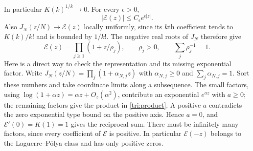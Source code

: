 In particular $K(k)^{1/k}\to0$.  For every $\epsilon>0$,
\[
 |\mathcal E(z)|\le C_\epsilon e^{\epsilon|z|}.
\]
Also $J_N(z/N)\to\mathcal E(z)$ locally uniformly, since its $k$th
coefficient tends to $K(k)/k!$ and is bounded by $1/k!$.
The negative real roots of $J_N$ therefore give
\begin{equation}\label{tri:product}
 \mathcal E(z)=\prod_{j\ge1}(1+z/\rho_j),\qquad
 \rho_j>0,\qquad \sum_j\rho_j^{-1}=1.
\end{equation}
Here is a direct way to check the representation and its missing
exponential factor.  Write
$J_N(z/N)=\prod_j(1+\alpha_{N,j}z)$ with
$\alpha_{N,j}\ge0$ and $\sum_j\alpha_{N,j}=1$.
Sort these numbers and take coordinate limits along a subsequence.
The small factors, using
$\log(1+\alpha z)=\alpha z+O_z(\alpha^2)$, contribute an exponential
$e^{az}$ with $a\ge0$; the remaining factors give the product in
\eqref{tri:product}.  A positive $a$ contradicts the zero exponential
type bound on the positive axis.  Hence $a=0$, and
$\mathcal E'(0)=K(1)=1$ gives the reciprocal sum.
There must be infinitely many factors, since every coefficient of
$\mathcal E$ is positive.  In particular $\mathcal E(-z)$ belongs
to the Laguerre--Pólya class and has only positive zeros.

